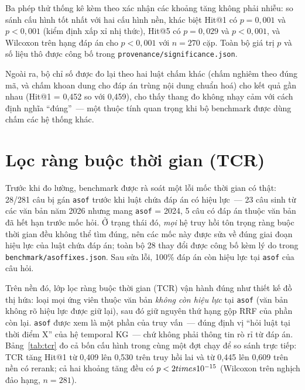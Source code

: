 \documentclass[12pt,a4paper]{report}
\renewcommand{\_}{\textunderscore\allowbreak}
\begin{document}
Ba phép thử thống kê kèm theo xác nhận các khoảng tăng không phải nhiễu: so sánh cấu hình tốt nhất với hai cấu hình nền, khác biệt Hit@1 có $p = 0{,}001$ và $p < 0{,}001$ (kiểm định xấp xỉ nhị thức), Hit@5 có $p = 0{,}029$ và $p < 0{,}001$, và Wilcoxon trên hạng đáp án cho $p < 0{,}001$ với $n = 270$ cặp. Toàn bộ giá trị $p$ và số liệu thô được công bố trong \texttt{provenance/significance.json}.

Ngoài ra, bộ chỉ số được đo lại theo hai luật chấm khác (chấm nghiêm theo đúng mã, và chấm khoan dung cho đáp án trùng nội dung chuẩn hoá) cho kết quả gần nhau (Hit@1 = 0,452 so với 0,459), cho thấy thang đo không nhạy cảm với cách định nghĩa ``đúng''~--- một thuộc tính quan trọng khi bộ benchmark được dùng chấm các hệ thống khác.

\section{Lọc ràng buộc thời gian (TCR)}\label{sec:tcr}

Trước khi đo lường, benchmark được rà soát một lỗi mốc thời gian có thật: 28/281 câu bị gán \texttt{as\_of} trước khi luật chứa đáp án có hiệu lực~--- 23 câu sinh từ các văn bản năm 2026 nhưng mang \texttt{as\_of} = 2024, 5 câu có đáp án thuộc văn bản đã hết hạn trước mốc hỏi. Ở trạng thái đó, \emph{mọi} hệ truy hồi tôn trọng ràng buộc thời gian đều không thể tìm đúng, nên các mốc này được sửa về đúng giai đoạn hiệu lực của luật chứa đáp án; toàn bộ 28 thay đổi được công bố kèm lý do trong \texttt{benchmark/as\_of\_fixes.json}. Sau sửa lỗi, 100\% đáp án còn hiệu lực tại \texttt{as\_of} của câu hỏi.

Trên nền đó, lớp lọc ràng buộc thời gian (\textsc{TCR}) vận hành đúng như thiết kế đồ thị hứa: loại mọi ứng viên thuộc văn bản \emph{không còn hiệu lực} tại \texttt{as\_of} (văn bản không rõ hiệu lực được giữ lại), sau đó giữ nguyên thứ hạng gộp RRF của phần còn lại. \texttt{as\_of} được xem là một phần của truy vấn~--- đúng định vị ``hỏi luật tại thời điểm X'' của hệ temporal KG~--- chứ không phải thông tin rò rỉ từ đáp án. Bảng~\ref{tab:tcr} đo cả bốn cấu hình trong cùng một đợt chạy để so sánh trực tiếp: TCR tăng Hit@1 từ 0,409 lên 0,530 trên truy hồi lai và từ 0,445 lên 0,609 trên nền có rerank; cả hai khoảng tăng đều có $p < 2\\times10^{-15}$ (Wilcoxon trên nghịch đảo hạng, $n = 281$).
\end{document}
